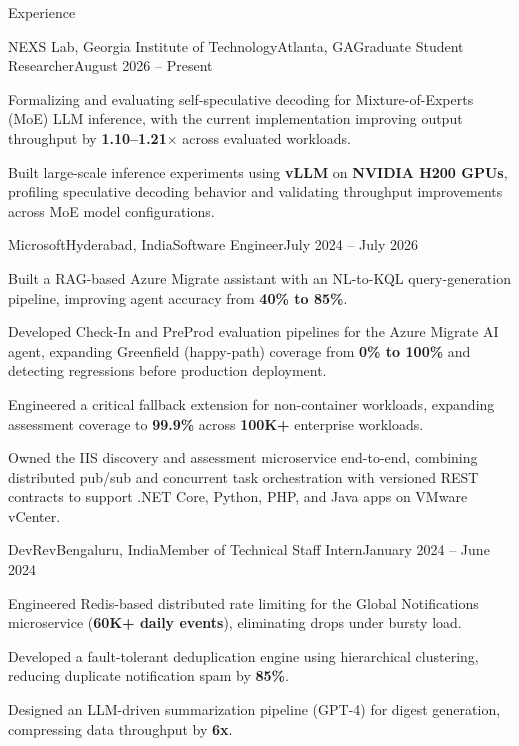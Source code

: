 \begin{rSection}{Experience}

    \begin{rSubsection}{NEXS Lab, Georgia Institute of Technology}{Atlanta, GA}{Graduate Student Researcher}{August 2026 -- Present}
        \item Formalizing and evaluating self-speculative decoding for Mixture-of-Experts (MoE) LLM inference, with the current implementation improving output throughput by \textbf{1.10--1.21$\times$} across evaluated workloads.
        \item Built large-scale inference experiments using \textbf{vLLM} on \textbf{NVIDIA H200 GPUs}, profiling speculative decoding behavior and validating throughput improvements across MoE model configurations.
    \end{rSubsection}

    \begin{rSubsection}{Microsoft}{Hyderabad, India}{Software Engineer}{July 2024 -- July 2026}
        \item Built a RAG-based Azure Migrate assistant with an NL-to-KQL query-generation pipeline, improving agent accuracy from \textbf{40\% to 85\%}.
        \item Developed Check-In and PreProd evaluation pipelines for the Azure Migrate AI agent, expanding Greenfield (happy-path) coverage from \textbf{0\% to 100\%} and detecting regressions before production deployment.
        \item Engineered a critical fallback extension for non-container workloads, expanding assessment coverage to \textbf{99.9\%} across \textbf{100K+} enterprise workloads.
        \item Owned the IIS discovery and assessment microservice end-to-end, combining distributed pub/sub and concurrent task orchestration with versioned REST contracts to support .NET Core, Python, PHP, and Java apps on VMware vCenter.
    \end{rSubsection}

    \begin{rSubsection}{DevRev}{Bengaluru, India}{Member of Technical Staff Intern}{January 2024 -- June 2024}
        \item Engineered Redis-based distributed rate limiting for the Global Notifications microservice (\textbf{60K+ daily events}), eliminating drops under bursty load.
        \item Developed a fault-tolerant deduplication engine using hierarchical clustering, reducing duplicate notification spam by \textbf{85\%}.
        \item Designed an LLM-driven summarization pipeline (GPT-4) for digest generation, compressing data throughput by \textbf{6x}.
    \end{rSubsection}


\end{rSection}
